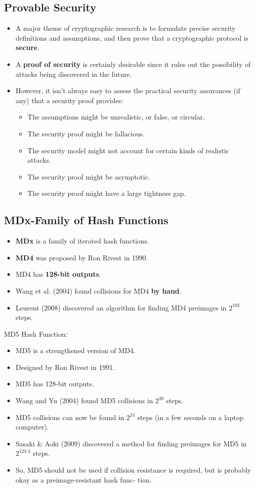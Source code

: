 \documentclass[12pt,titlepage]{article}
\begin{document}
\subsection{Provable Security}
\begin{itemize}
	\item A major theme of cryptographic research is to formulate precise security definitions and assumptions, and then prove that a cryptographic protocol is \textbf{secure}.
	\item A \textbf{proof of security} is certainly desirable since it rules out the possibility of attacks being discovered in the future.
	\item However, it isn’t always easy to assess the practical security assurances (if any) that a security proof provides: \begin{itemize}
	\item The assumptions might be unrealistic, or false, or circular.
	\item The security proof might be fallacious.
	\item The security model might not account for certain kinds of realistic attacks.
	\item The security proof might be asymptotic.
	\item The security proof might have a large tightness gap.
\end{itemize}
\end{itemize}

\subsection{MDx-Family of Hash Functions}
\begin{itemize}
	\item \textbf{MDx} is a family of iterated hash functions.
	\item \textbf{MD4} was proposed by Ron Rivest in 1990.
	\item MD4 has \textbf{128-bit outputs}.
	\item Wang et al. (2004) found collisions for MD4 \textbf{by hand}.
	\item Leurent (2008) discovered an algorithm for finding MD4 preimages in $2^{102}$ steps.
\end{itemize}

MD5 Hash Function: \begin{itemize}
\item MD5 is a strengthened version of MD4.
\item Designed by Ron Rivest in 1991.
\item MD5 has 128-bit outputs.
\item Wang and Yu (2004) found MD5 collisions in $2^{39}$ steps.
\item MD5 collisions can now be found in $2^{24}$ steps (in a few seconds on a laptop computer).
\item Sasaki \& Aoki (2009) discovered a method for finding preimages for MD5 in $2^{123.4}$ steps.
\item So, MD5 should not be used if collision resistance is required, but is probably okay as a preimage-resistant hash func- tion.
\end{itemize}
\end{document}

